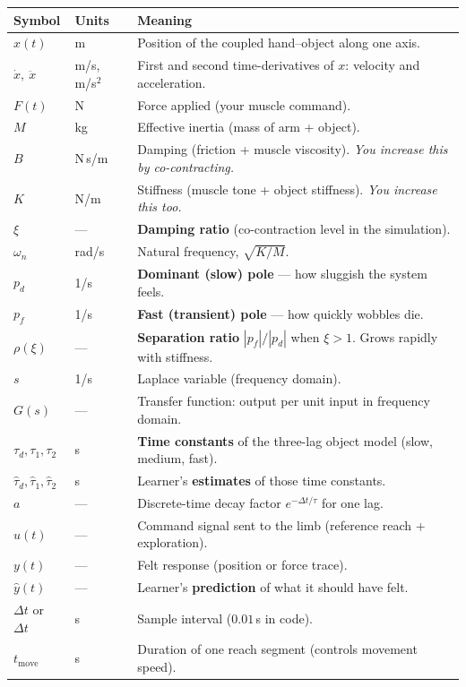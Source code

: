 \documentclass[11pt,a4paper]{article}
\newcommand{\dt}{\Delta t}
\begin{document}
\small
\begin{longtable}{@{}p{2.4cm}p{1.6cm}p{9.8cm}@{}}
\toprule
\textbf{Symbol} & \textbf{Units} & \textbf{Meaning} \\
\midrule
\endhead
$x(t)$ & m & Position of the coupled hand--object along one axis. \\
$\dot x,\ \ddot x$ & m/s, m/s$^2$ & First and second time-derivatives of $x$: velocity and acceleration. \\
$F(t)$ & N & Force applied (your muscle command). \\
$M$ & kg & Effective inertia (mass of arm + object). \\
$B$ & N\,s/m & Damping (friction + muscle viscosity). \emph{You increase this by co-contracting.} \\
$K$ & N/m & Stiffness (muscle tone + object stiffness). \emph{You increase this too.} \\
$\xi$ & --- & \textbf{Damping ratio} (co-contraction level in the simulation). \\
$\omega_n$ & rad/s & Natural frequency, $\sqrt{K/M}$. \\
$p_d$ & 1/s & \textbf{Dominant (slow) pole} --- how sluggish the system feels. \\
$p_f$ & 1/s & \textbf{Fast (transient) pole} --- how quickly wobbles die. \\
$\rho(\xi)$ & --- & \textbf{Separation ratio} $|p_f|/|p_d|$ when $\xi>1$. Grows rapidly with stiffness. \\
$s$ & 1/s & Laplace variable (frequency domain). \\
$G(s)$ & --- & Transfer function: output per unit input in frequency domain. \\
$\tau_d,\tau_1,\tau_2$ & s & \textbf{Time constants} of the three-lag object model (slow, medium, fast). \\
$\hat\tau_d,\hat\tau_1,\hat\tau_2$ & s & Learner's \textbf{estimates} of those time constants. \\
$a$ & --- & Discrete-time decay factor $e^{-\dt/\tau}$ for one lag. \\
$u(t)$ & --- & Command signal sent to the limb (reference reach + exploration). \\
$y(t)$ & --- & Felt response (position or force trace). \\
$\hat y(t)$ & --- & Learner's \textbf{prediction} of what it should have felt. \\
$\Delta t$ or $\dt$ & s & Sample interval ($0.01$\,s in code). \\
$t_{\mathrm{move}}$ & s & Duration of one reach segment (controls movement speed). \\

\end{longtable}
\end{document}
